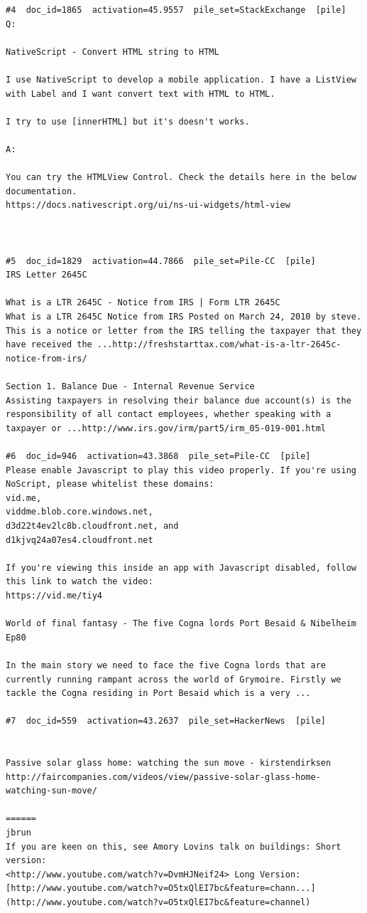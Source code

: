 \begin{verbatim}
#4  doc_id=1865  activation=45.9557  pile_set=StackExchange  [pile]
Q:

NativeScript - Convert HTML string to HTML

I use NativeScript to develop a mobile application. I have a ListView with Label and I want convert text with HTML to HTML.

I try to use [innerHTML] but it's doesn't works.

A:

You can try the HTMLView Control. Check the details here in the below documentation.
https://docs.nativescript.org/ui/ns-ui-widgets/html-view



#5  doc_id=1829  activation=44.7866  pile_set=Pile-CC  [pile]
IRS Letter 2645C

What is a LTR 2645C - Notice from IRS | Form LTR 2645C
What is a LTR 2645C Notice from IRS Posted on March 24, 2010 by steve. This is a notice or letter from the IRS telling the taxpayer that they have received the ...http://freshstarttax.com/what-is-a-ltr-2645c-notice-from-irs/

Section 1. Balance Due - Internal Revenue Service
Assisting taxpayers in resolving their balance due account(s) is the responsibility of all contact employees, whether speaking with a taxpayer or ...http://www.irs.gov/irm/part5/irm_05-019-001.html

#6  doc_id=946  activation=43.3868  pile_set=Pile-CC  [pile]
Please enable Javascript to play this video properly. If you're using
NoScript, please whitelist these domains:
vid.me,
viddme.blob.core.windows.net,
d3d22t4ev2lc8b.cloudfront.net, and
d1kjvq24a07es4.cloudfront.net

If you're viewing this inside an app with Javascript disabled, follow
this link to watch the video:
https://vid.me/tiy4

World of final fantasy - The five Cogna lords Port Besaid & Nibelheim Ep80

In the main story we need to face the five Cogna lords that are currently running rampant across the world of Grymoire. Firstly we tackle the Cogna residing in Port Besaid which is a very ...

#7  doc_id=559  activation=43.2637  pile_set=HackerNews  [pile]


Passive solar glass home: watching the sun move - kirstendirksen
http://faircompanies.com/videos/view/passive-solar-glass-home-watching-sun-move/

======
jbrun
If you are keen on this, see Amory Lovins talk on buildings: Short version:
<http://www.youtube.com/watch?v=DvmHJNeif24> Long Version:
[http://www.youtube.com/watch?v=O5txQlEI7bc&feature=chann...](http://www.youtube.com/watch?v=O5txQlEI7bc&feature=channel)


\end{verbatim}
